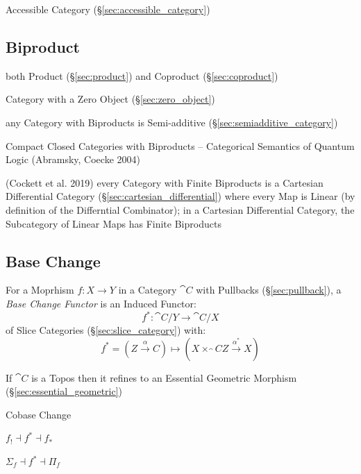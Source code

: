 Accessible Category (\S\ref{sec:accessible_category})



\subsection{Biproduct}\label{sec:biproduct}

both Product (\S\ref{sec:product}) and Coproduct (\S\ref{sec:coproduct})

Category with a Zero Object (\S\ref{sec:zero_object})

any Category with Biproducts is Semi-additive
(\S\ref{sec:semiadditive_category})

Compact Closed Categories with Biproducts -- Categorical Semantics of Quantum
Logic (Abramsky, Coecke 2004)

(Cockett et al. 2019) every Category with Finite Biproducts is a Cartesian
Differential Category (\S\ref{sec:cartesian_differential}) where every Map is
Linear (by definition of the Differntial Combinator); in a Cartesian
Differential Category, the Subcategory of Linear Maps has Finite Biproducts



\subsection{Base Change}\label{sec:base_change}

For a Moprhism $f : X \rightarrow Y$ in a Category $\cat{C}$ with
Pullbacks (\S\ref{sec:pullback}), a \emph{Base Change Functor} is an
Induced Functor:
\[
  f^* : \cat{C}/Y \rightarrow \cat{C}/X
\]
of Slice Categories (\S\ref{sec:slice_category}) with:
\[
  f^* = (Z \xrightarrow{\alpha} C) \mapsto
    (X \times_\cat{C} Z \xrightarrow{\alpha^*} X)
\]

If $\cat{C}$ is a Topos then it refines to an Essential Geometric
Morphism (\S\ref{sec:essential_geometric})


Cobase Change

$f_! \dashv f^* \dashv f_*$

$\Sigma_f \dashv f^* \dashv \Pi_f$



